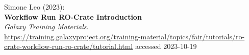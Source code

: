 \documentclass[10pt,letterpaper]{article}
\begin{document}
\begin{thebibliography}{10}
\begin{small}

Simone Leo (2023):\\
\textbf{Workflow Run RO-Crate Introduction} \\
\emph{Galaxy Training Materials}.\\
\url{https://training.galaxyproject.org/training-material/topics/fair/tutorials/ro-crate-workflow-run-ro-crate/tutorial.html} accessed 2023-10-19





\end{small}


\end{thebibliography}
\end{document}
